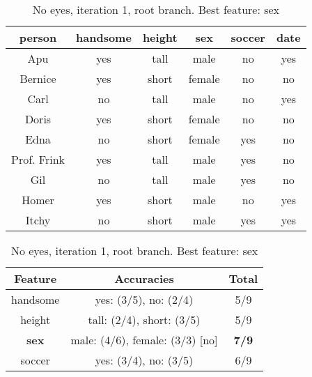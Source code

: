 \begin{table}[h!]
  \centering
  \begin{tabular}{ccccc|c}
    \toprule
    person      & handsome & height & sex    & soccer & date\\
    \midrule
    Apu         & yes      & tall   & male   & no     & yes \\
    Bernice     & yes      & short  & female & no     & no  \\
    Carl        & no       & tall   & male   & no     & yes \\
    Doris       & yes      & short  & female & no     & no  \\
    Edna        & no       & short  & female & yes    & no  \\
    Prof. Frink & yes      & tall   & male   & yes    & no  \\
    Gil         & no       & tall   & male   & yes    & no  \\
    Homer       & yes      & short  & male   & no     & yes \\
    Itchy       & no       & short  & male   & yes    & yes \\
    \bottomrule
  \end{tabular}

  \vspace{.5cm}

  \begin{tabular}{ccc}
    \toprule
    Feature      & Accuracies                              & Total\\
    \midrule
    handsome     & yes: (3/5), no: (2/4)                   & 5/9\\
    height       & tall: (2/4), short: (3/5)               & 5/9\\
    \textbf{sex} & male: (4/6), female: (3/3) [no]         & \textbf{7/9}\\
    soccer       & yes: (3/4), no: (3/5)                   & 6/9\\
    \bottomrule
  \end{tabular}
  \caption*{No eyes, iteration 1, root branch. Best feature: sex}
\end{table}

